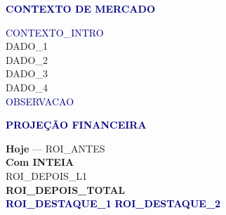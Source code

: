 \documentclass[a4paper,landscape]{article}
\begin{document}
\vspace{3.5mm}

\begin{minipage}[t]{0.315\textwidth}


{\fontsize{10}{12}\selectfont\textsf{\textcolor{navy}{}\;\textcolor{navy}{\textbf{CONTEXTO DE MERCADO}}}}

\begin{tcolorbox}[box, colback=navy!4, colframe=navy!4, top=2.5mm, bottom=2.5mm]
\fontsize{8.2}{11.5}\selectfont\textsf{%
\textcolor{navy}{{{CONTEXTO_INTRO}}}\\[1.5mm]
\textcolor{textsecondary}{} {{DADO_1}}\\[0.8mm]
\textcolor{textsecondary}{} {{DADO_2}}\\[0.8mm]
\textcolor{textsecondary}{} {{DADO_3}}\\[0.8mm]
\textcolor{textsecondary}{} {{DADO_4}}\\[1.5mm]
\textcolor{navy}{{{OBSERVACAO}}}%
}
\end{tcolorbox}

\vspace{3mm}

{\fontsize{10}{12}\selectfont\textsf{\textcolor{navy}{}\;\textcolor{navy}{\textbf{PROJE\c{C}\~AO FINANCEIRA}}}}

\begin{tcolorbox}[box, colback=success!6, colframe=success!6, top=2.5mm, bottom=2.5mm]
\fontsize{8.2}{11}\selectfont\textsf{%
\textcolor{textsecondary}{\textbf{Hoje}} \textcolor{textlight}{--- {{ROI_ANTES}}}\\[2mm]
\textcolor{success}{\textbf{Com INTEIA}}\\[0.5mm]
\textcolor{textprimary}{{{ROI_DEPOIS_L1}}}\\[0.5mm]
\textcolor{success}{\textbf{{{ROI_DEPOIS_TOTAL}}}}\\[2mm]
\textcolor{navy}{} \textcolor{navy}{\textbf{{{ROI_DESTAQUE_1}}}}\;\;\textcolor{navy}{} \textcolor{navy}{\textbf{{{ROI_DESTAQUE_2}}}}%
}
\end{tcolorbox}


\end{minipage}
\end{document}
